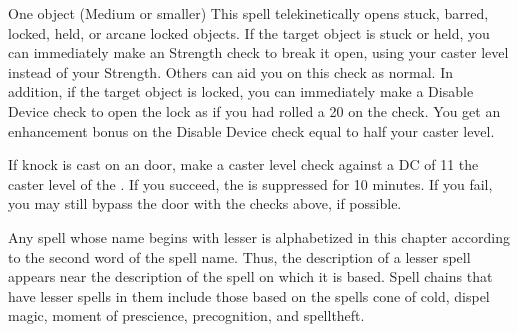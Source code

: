 \begin{comment}
\subsubsection{J-L}
\end{comment}

\begin{spellheader}
    \spellrng{\rngclose}
\end{spellheader}
\begin{spelleffects}
    \begin{spelltarget}{One object (Medium or smaller)}
        \spelleffect This spell telekinetically opens stuck, barred, locked, held, or arcane locked objects. If the target object is stuck or held, you can immediately make an Strength check to break it open, using your caster level instead of your Strength. Others can aid you on this check as normal. In addition, if the target object is locked, you can immediately make a Disable Device check to open the lock as if you had rolled a 20 on the check. You get an enhancement bonus on the Disable Device check equal to half your caster level.
    \end{spelltarget}
\end{spelleffects}
\begin{spellfooter}
    \spellnotes If knock is cast on an  door, make a caster level check against a DC of 11 \add the caster level of the . If you succeed, the  is suppressed for 10 minutes. If you fail, you may still bypass the door with the checks above, if possible.

    \par Any spell whose name begins with lesser is alphabetized in this chapter according to the second word of the spell name. Thus, the description of a lesser spell appears near the description of the spell on which it is based. Spell chains that have lesser spells in them include those based on the spells cone of cold, dispel magic, moment of prescience, precognition, and spelltheft.
\end{spellfooter}

